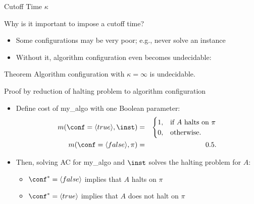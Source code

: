 \begin{frame}[c]{Cutoff Time $\kappa$}


Why is it important to impose a cutoff time?
\hands

\pause

\begin{itemize}
  \item Some configurations may be very poor; e.g., never solve an instance
  \pause
  \item Without it, algorithm configuration even becomes undecidable:
\end{itemize}

\begin{block}{Theorem}
  Algorithm configuration with $\kappa = \infty$ is undecidable.
\end{block}

\pause


\begin{block}{Proof by reduction of halting problem to algorithm configuration}
  \begin{itemize}
	\item Define cost of my\_algo with one Boolean parameter:
\vspace*{-0.4cm}
\begin{eqnarray}
\nonumber{}  m(\conf= \langle true \rangle,\inst )&=&
  \begin{cases}
    1, & \text{if $A$ halts on $\pi$}\\
    0, & \text{otherwise}.
  \end{cases}\\
\nonumber{}  m(\conf=\langle false \rangle, \pi) &=& 0.5.
\end{eqnarray}
\pause
\vspace*{-0.6cm}
	\item Then, solving AC for my\_algo and $\inst$ solves the halting problem for $A$:
	\begin{itemize}
	  \item $\conf^* = \langle false \rangle$ implies that $A$ halts on $\pi$ 
	  \item $\conf^* = \langle true \rangle$ implies that $A$ does not halt on $\pi$ 
	\end{itemize}
  \end{itemize}
\end{block}

\end{frame}



